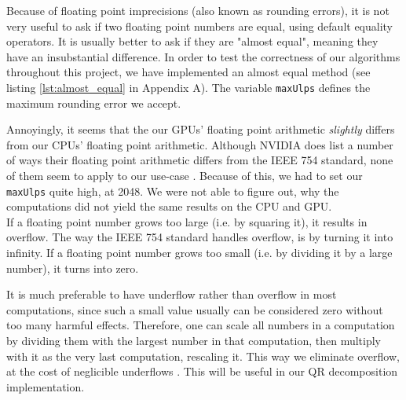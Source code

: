 Because of floating point imprecisions (also known as rounding errors), it is not very useful to ask if two floating point numbers are equal, using default equality operators. It is usually better to ask if they are "almost equal", meaning they have an insubstantial difference. In order to test the correctness of our algorithms throughout this project, we have implemented an almost equal method (see listing \ref{lst:almost_equal} in Appendix A). The variable \texttt{maxUlps} defines the maximum rounding error we accept.

Annoyingly, it seems that the our GPUs' floating point arithmetic \textit{slightly} differs from our CPUs' floating point arithmetic. Although NVIDIA does list a number of ways their floating point arithmetic differs from the IEEE 754 standard, none of them seem to apply to our use-case \cite[Sect. 13.1]{nvidia:cudadoc}. Because of this, we had to set our \texttt{maxUlps} quite high, at 2048. We were not able to figure out, why the computations did not yield the same results on the CPU and GPU.\\

\noindent If a floating point number grows too large (i.e. by squaring it), it results in overflow. The way the IEEE 754 standard handles overflow, is by turning it into infinity. If a floating point number grows too small (i.e. by dividing it by a large number), it turns into zero. 

It is much preferable to have underflow rather than overflow in most computations, since such a small value usually can be considered zero without too many harmful effects. Therefore, one can scale all numbers in a computation by dividing them with the largest number in that computation, then multiply with it as the very last computation, rescaling it. This way we eliminate overflow, at the cost of neglicible underflows \cite{afternotes}. This will be useful in our QR decomposition implementation.

